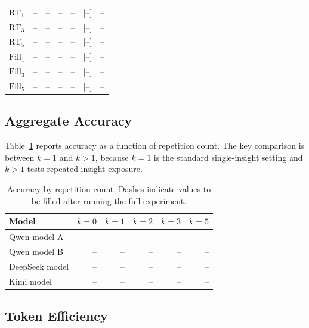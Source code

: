 \begin{table}[t]
\begin{center}
\begin{small}
\begin{tabular}{lcccccc}
    \midrule
    $\mathrm{RT}_1$       & --   & --  & --  & --   & {[--]} & --  \\
    $\mathrm{RT}_3$       & --   & --  & --  & --   & {[--]} & --  \\
    $\mathrm{RT}_5$       & --   & --  & --  & --   & {[--]} & --  \\
    \midrule
    $\mathrm{Fill}_1$     & --   & --  & --  & --   & {[--]} & --  \\
    $\mathrm{Fill}_3$     & --   & --  & --  & --   & {[--]} & --  \\
    $\mathrm{Fill}_5$     & --   & --  & --  & --   & {[--]} & --  \\
    \bottomrule
  \end{tabular}
  \end{small}
  \end{center}
  \vskip -0.1in
\end{table}

\subsection{Aggregate Accuracy}

Table~\ref{tab:accuracy-by-k} reports accuracy as a function of repetition count. The key comparison is between $k=1$ and $k>1$, because $k=1$ is the standard single-insight setting and $k>1$ tests repeated insight exposure.

\begin{table}[t]
    \centering
    \begin{tabular}{lrrrrr}
        \hline
        Model & $k=0$ & $k=1$ & $k=2$ & $k=3$ & $k=5$ \\
        \hline
        Qwen model A & -- & -- & -- & -- & -- \\
        Qwen model B & -- & -- & -- & -- & -- \\
        DeepSeek model & -- & -- & -- & -- & -- \\
        Kimi model & -- & -- & -- & -- & -- \\
        \hline
    \end{tabular}
    \caption{Accuracy by repetition count. Dashes indicate values to be filled after running the full experiment.}
    \label{tab:accuracy-by-k}
\end{table}

\subsection{Token Efficiency}

